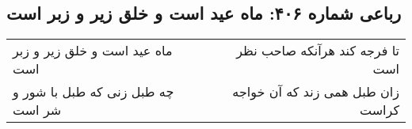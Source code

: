 \begin{center}
\section*{رباعی شماره ۴۰۶: ماه عید است و خلق زیر و زبر است}
\label{sec:0406}
\begin{longtable}{l p{0.5cm} r}
ماه عید است و خلق زیر و زبر است
&&
تا فرجه کند هرآنکه صاحب نظر است
\\
چه طبل زنی که طبل با شور و شر است
&&
زان طبل همی زند که آن خواجه کراست
\\
\end{longtable}
\end{center}
